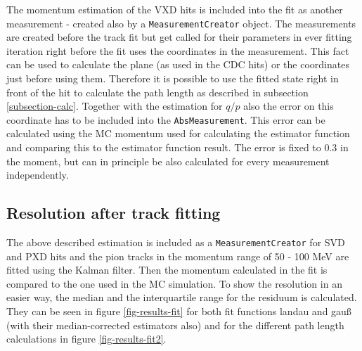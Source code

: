 The momentum estimation of the VXD hits is included into the fit as another measurement - created also by a \texttt{MeasurementCreator} object. The measurements are created before the track fit but get called for their parameters in ever fitting iteration right before the fit uses the coordinates in the measurement. This fact can be used to calculate the plane (as used in the CDC hits) or the coordinates just before using them. Therefore it is possible to use the fitted state right in front of the hit to calculate the path length as described in subsection \ref{subsection-calc}. Together with the estimation for $q/p$ also the error on this coordinate has to be included into the \texttt{AbsMeasurement}. This error can be calculated using the MC momentum used for calculating the estimator function and comparing this to the estimator function result. The error is fixed to 0.3 in the moment, but can in principle be also calculated for every measurement independently.

\subsection{Resolution after track fitting}

The above described estimation is included as a \texttt{MeasurementCreator} for SVD and PXD hits and the pion tracks in the momentum range of 50 - 100 MeV are fitted using the Kalman filter. Then the momentum calculated in the fit is compared to the one used in the MC simulation. To show the resolution in an easier way, the median and the interquartile range for the residuum is calculated. They can be seen in figure \ref{fig-results-fit} for both fit functions landau and gauß (with their median-corrected estimators also) and for the different path length calculations in figure \ref{fig-results-fit2}.

